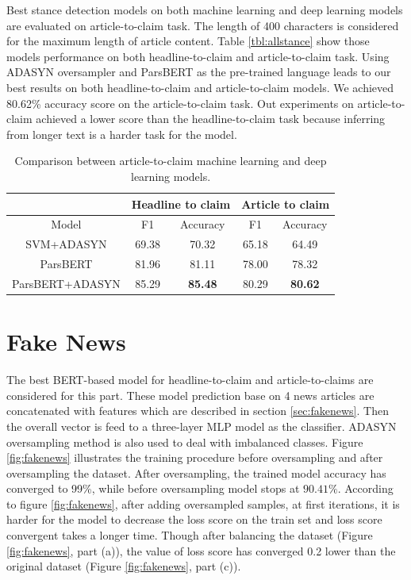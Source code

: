 Best stance detection models on both machine learning and deep learning models are evaluated on article-to-claim task. The length of 400 characters is considered for the maximum length of article content. Table \ref{tbl:allstance} show those models performance on both headline-to-claim and article-to-claim task. Using ADASYN oversampler and ParsBERT as the pre-trained language leads to our best results on both headline-to-claim and article-to-claim models. We achieved 80.62\% accuracy score on the article-to-claim task. Out experiments on article-to-claim achieved a lower score than the headline-to-claim task because inferring from longer text is a harder task for the model.  

\begin{table}[t]
	\centering
	\small
	\caption{Comparison between article-to-claim machine learning and deep learning models.}
	\def\arraystretch{1.3}%
	\setlength{\extrarowheight}{5pt}%
	\begin{tabular}{|c|c|c|c|c|}
		\hline
		{} & \multicolumn{2}{c|}{Headline to claim} &  \multicolumn{2}{c|}{Article to claim}\\
		\hline 
		{Model} & {F1} & {Accuracy} & {F1} & {Accuracy}\\
		\hline	\hline
		{SVM+ADASYN} & {69.38} & {70.32} & {65.18} & {64.49}\\
		\hline
		{ParsBERT} & {81.96} & {81.11} & {78.00} & {78.32}\\
		\hline
		{ParsBERT+ADASYN} & {85.29} & \textbf{{85.48}} & {80.29} & \textbf{{80.62}}\\
		\hline
	\end{tabular}
	\label{tbl:a2c}
\end{table}

\section{Fake News}
The best BERT-based model for headline-to-claim and article-to-claims are considered for this part. These model prediction base on 4 news articles are concatenated with features which are described in section \ref{sec:fakenews}. Then the overall vector is feed to a three-layer MLP model as the classifier. ADASYN oversampling method is also used to deal with imbalanced classes. Figure \ref{fig:fakenews} illustrates the training procedure before oversampling and after oversampling the dataset. After oversampling, the trained model accuracy has converged to 99\%, while before oversampling model stops at $90.41\%$. According to figure \ref{fig:fakenews}, after adding oversampled samples, at first iterations, it is harder for the model to decrease the loss score on the train set and loss score convergent takes a longer time. Though after balancing the dataset (Figure \ref{fig:fakenews}, part (a)), the value of loss score has converged 0.2 lower than the original dataset (Figure \ref{fig:fakenews}, part (c)).


